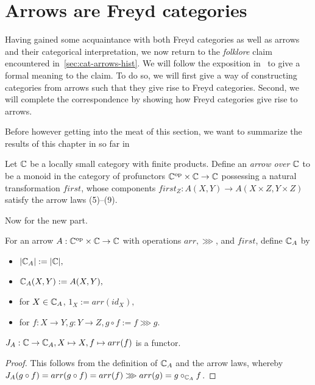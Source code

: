 \section{Arrows are Freyd categories}

Having gained some acquaintance with both Freyd categories as well as arrows and
their categorical interpretation, we now return to the \emph{folklore} claim
encountered in~\ref{sec:cat-arrows-hist}. We will follow the exposition
in~\cite{cat-semantics-arr} to give a formal meaning to the claim. To do so, we
will first give a way of constructing categories from arrows such that they give
rise to Freyd categories. Second, we will complete the correspondence by showing
how Freyd categories give rise to arrows.

Before however getting into the meat of this section, we want to summarize the
results of this chapter in so far in

\begin{definition}\label{def:catarr}
    Let $\mathbb{C}$ be a locally small category with finite products. Define an
    \emph{arrow over $\mathbb{C}$} to be a monoid in the category of profunctors
    ${\mathbb{C}}^{\text{op}} \times \mathbb{C} \to \mathbb{C}$ possessing a natural transformation
    $first$, whose components $first_Z: A(X, Y) \to A(X \times Z, Y \times Z)$
    satisfy the arrow laws (5)--(9).
\end{definition}

Now for the new part.

\begin{definition}
    For an arrow $A : {\mathbb{C}}^{\text{op}} \times \mathbb{C} \to \mathbb{C}$ with operations
    $arr, \ggg$, and $first$, define $\mathbb{C}_A$ by
    \begin{itemize}
        \item $|\mathbb{C}_A| := |\mathbb{C}|,$
        \item $\mathbb{C}_A(X, Y) := A(X, Y),$
        \item for $X \in \mathbb{C}_A$, $1_X := arr(id_X),$
        \item for $f: X \to Y, g: Y \to Z, g \circ f := f \ggg g$.
    \end{itemize}
\end{definition}

\begin{proposition}
    $J_A : \mathbb{C} \to \mathbb{C}_A, X \mapsto X, f \mapsto arr(f)$ is a functor.
\end{proposition}

\begin{proof}
    This follows from the definition of $\mathbb{C}_A$ and the arrow laws, whereby
    $J_A(g \circ f) = arr(g \circ f) = arr(f) \ggg arr(g) = g \circ_{\mathbb{C}_A}
    f$.
\end{proof}

